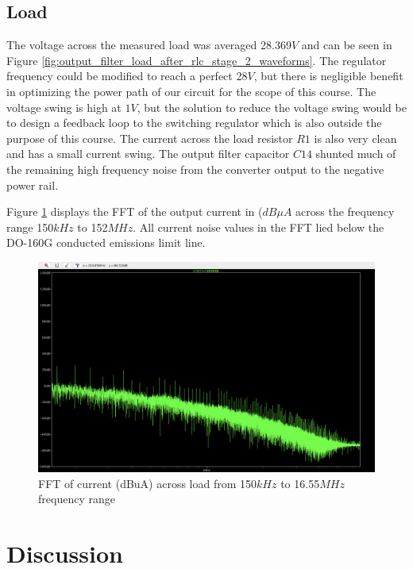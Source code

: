 \documentclass[conference]{IEEEtran}
\begin{document}
\subsection{Load}

The voltage across the measured load was averaged 28.369$V$ and can be seen in Figure \ref{fig:output_filter_load_after_rlc_stage_2_waveforms}. The regulator frequency could be modified to reach a perfect 28$V$, but there is negligible benefit in optimizing the power path of our circuit for the scope of this course. The voltage swing is high at $1V$, but the solution to reduce the voltage swing would be to design a feedback loop to the switching regulator which is also outside the purpose of this course. The current across the load resistor $R1$ is also very clean and has a small current swing. The output filter capacitor $C14$ shunted much of the remaining high frequency noise from the converter output to the negative power rail.

Figure \ref{fig:load_fft_150kHz_16MHz_waveform} displays the FFT of the output current in ($dB \mu A$ across the frequency range 150$kHz$ to 152$MHz$. All current noise values in the FFT lied below the DO-160G conducted emissions limit line.

\begin{figure}[h]
    \centering
    \includegraphics[width=1.0\linewidth]{load_fft_150kHz_16MHz.png}
    \caption{FFT of current (dBuA) across load from 150$kHz$ to 16.55$MHz$ frequency range}
    \label{fig:load_fft_150kHz_16MHz_waveform}
\end{figure}

\clearpage

\section{Discussion}
\end{document}
